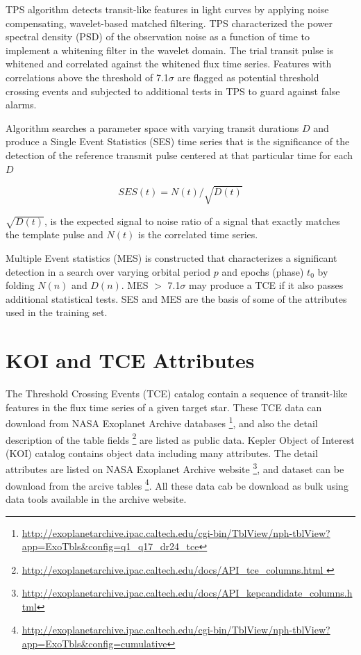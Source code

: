 TPS algorithm detects transit-like features in light curves by applying noise compensating, wavelet-based matched filtering. TPS characterized the power spectral density (PSD) of the observation noise as a function of time to implement a whitening filter in the wavelet domain. The trial transit pulse is whitened and correlated against the whitened flux time series. Features with correlations above the threshold of 7.1$\sigma$ are flagged as potential threshold crossing events and subjected to additional tests in TPS to guard against false alarms.

Algorithm searches a parameter space with varying transit durations $D$ and produce a Single Event Statistics (SES) time series that is the significance of the detection of the reference transmit pulse centered at that particular time for each $D$

\begin{equation}\label{eq:ses}
	SES(t) = N(t) /\sqrt{D(t)}
\end{equation}

$\sqrt{D(t)}$, is the expected signal to noise ratio of a signal that exactly matches the template pulse and $N(t)$ is the correlated time series.



Multiple Event statistics (MES) is constructed that characterizes a significant detection in a search over varying orbital period $p$ and epochs (phase) $t_0$ by folding $N(n)$ and $D(n)$. MES  $>$ 7.1$\sigma$ may produce a TCE if it also passes additional statistical tests. SES and MES are the basis of some of the attributes used in the training set.


\section{KOI and TCE Attributes }

The Threshold Crossing Events (TCE) catalog contain a sequence of transit-like features in the flux time series of a given target star. These TCE data can download from NASA Exoplanet Archive databases \footnote{\url{http://exoplanetarchive.ipac.caltech.edu/cgi-bin/TblView/nph-tblView?app=ExoTbls&config=q1_q17_dr24_tce}}, and also the detail description of the table fields \footnote{\url{http://exoplanetarchive.ipac.caltech.edu/docs/API_tce_columns.html }} are listed as public data. Kepler Object of Interest (KOI) catalog contains object data including many attributes. The detail attributes are listed on NASA Exoplanet Archive website \footnote{\url{
http://exoplanetarchive.ipac.caltech.edu/docs/API_kepcandidate_columns.html}}, and dataset can be download from the arcive tables \footnote{\url{http://exoplanetarchive.ipac.caltech.edu/cgi-bin/TblView/nph-tblView?app=ExoTbls&config=cumulative}}. All these data cab be download as bulk using data tools available in the archive website.

